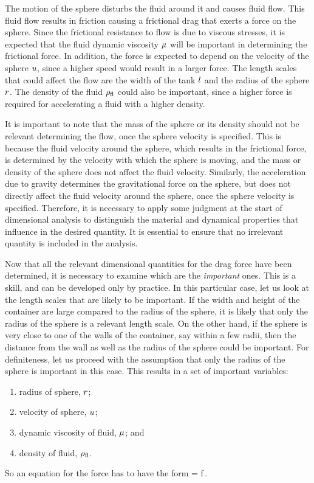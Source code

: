 \begin{solution}
The motion of the sphere disturbs the fluid around it and causes fluid flow. This fluid flow results in friction causing a frictional drag that exerts a force on the sphere. Since the frictional resistance to flow is due to viscous stresses, it is expected that the fluid dynamic viscosity $\mu$ will be important in determining the frictional force. In addition, the force is expected to depend on the velocity of the sphere $u$, since a higher speed would result in a larger force. The length scales that could affect the flow are the width of the tank $l$ and the radius of the sphere $r$. The density of the fluid $\rho_\text{fl}$ could also be important, since a higher force is required for accelerating a fluid with a higher density.

It is important to note that the mass of the sphere or its density should not be relevant determining the flow, once the sphere velocity is specified. This is because the fluid velocity around the sphere, which results in the frictional force, is determined by the velocity with which the sphere is moving, and the mass or density of the sphere does not affect the fluid velocity. Similarly, the acceleration due to gravity determines the gravitational force on the sphere, but does not directly affect the fluid velocity around the sphere, once the sphere velocity is specified. Therefore, it is necessary to apply some judgment at the start of dimensional analysis to distinguish the material and dynamical properties that influence in the desired quantity. It is essential to ensure that no irrelevant quantity is included in the analysis.

Now that all the relevant dimensional quantities for the drag force have been determined, it is necessary to examine which are the \emph{important} ones. This is a skill, and can be developed only by practice. In this particular case, let us look at the length scales that are likely to be important. If the width and height of the container are large compared to the radius of the sphere, it is likely that only the radius of the sphere is a relevant length scale. On the other hand, if the sphere is very close to one of the walls of the container, say within a few radii, then the distance from the wall as well as the radius of the sphere could be important. For definiteness, let us proceed with the assumption that only the radius of the sphere is important in this case. This results in a set of important variables:
\begin{enumerate}
\item radius of sphere, $r$; 
\item velocity of sphere, $u$;
\item dynamic viscosity of fluid, $\mu$; and 
\item density of fluid, $\rho_\text{fl}$.
\end{enumerate}
So an equation for the force has to have the form
\beq
\drag = f\,.
\eeq


\end{solution}
